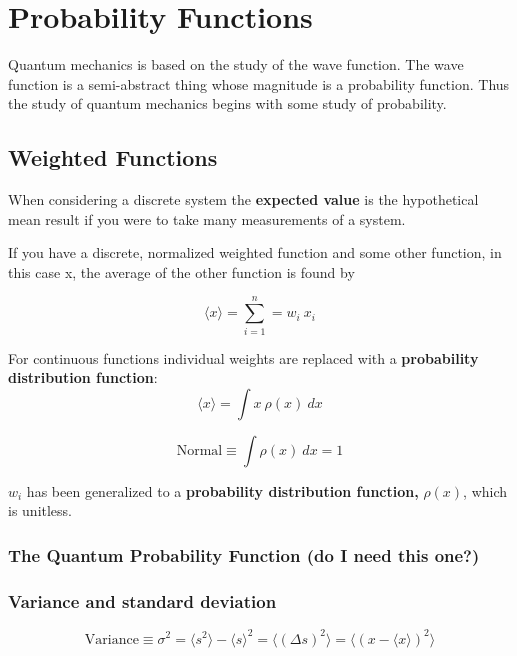 \section{Probability Functions}
Quantum mechanics is based on the study of the wave function. The wave function is a semi-abstract thing whose magnitude is a probability function. Thus the study of quantum mechanics begins with some study of probability.

\subsection{Weighted Functions}
When considering a discrete system the \textbf{expected value} is the hypothetical mean result if you were to take many measurements of a system. 

If you have a discrete, normalized weighted function and some other function, in this case x, the average of the other function is found by

\begin{equation}
  \langle x \rangle = \sum_{i=1}^{n}=w_{i}~x_{i}
\end{equation}



For continuous functions individual weights are replaced with a \textbf{probability distribution function}:
\begin{equation}
  \langle x\rangle = \int x~\rho(x)~dx
\end{equation}

\begin{equation}
  \text{Normal}\equiv \int\rho(x)~dx =1
\end{equation}

$ w_{i} $ has been generalized to a \textbf{probability distribution function,} $ \rho(x) $, which is unitless. 

\subsubsection{The Quantum Probability Function (do I need this one?)}





\subsubsection{Variance and standard deviation}
\begin{equation}
  \text{Variance}\equiv\sigma^2=\langle s^2 \rangle - \langle s\rangle^2=\langle{(\Delta s)}^2\rangle=\langle{(x-\langle x\rangle)}^2\rangle
\end{equation}

